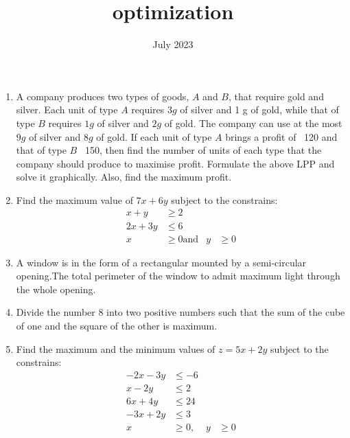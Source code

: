 \documentclass{article}
\begin{document}
\begin{center}
\title{optimization}
\date{July 2023}
\maketitle     
\end{center}
\begin{enumerate}
  
\item A company produces two types of goods, $A$ and $B$, that require gold and
silver. Each unit of type $A$ requires $3g$ of silver and 1 g of gold, while that
of type $B$ requires $1g$ of silver and $2g$ of gold. The company can use at
the most $9g$ of silver and $8g$ of gold. If each unit of type $A$ brings a profit
of \rupee~120 and that of type $B$ \rupee~150, then find the number of units of each type that the company should produce to maximise profit. Formulate the above LPP and solve it graphically. Also, find the maximum profit.
\item Find the maximum value of $7x+6y$ subject to the constrains:
\begin{align}
	x+y &\geq   2\\
	2x+3y &\leq 6\\
	x &\geq 0 \text{and} &y &\geq 0
\end{align}
\item A window is in the form of a rectangular mounted by a semi-circular opening.The total perimeter of the window to admit maximum light through the whole opening.
\item Divide the number $8$ into two positive numbers such that the sum of the cube of one and the square of the other is maximum.
\item Find the maximum and the minimum values of $z=5x+2y$ subject to the constrains:
\begin{align}
	-2x-3y &\leq -6\\
	x-2y &\leq 2\\
	6x+4y &\leq 24\\
	-3x+2y &\leq 3\\
	x &\geq 0, &y& \geq 0
\end{align}
 

\end{enumerate}
\end{document}
